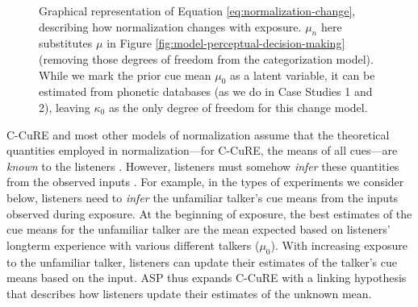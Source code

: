 \documentclass[
  11pt,
  man,floatsintext]{apa6}
\begin{document}
\begin{figure}
\centering
\caption{Graphical representation of Equation \ref{eq:normalization-change}, describing how normalization changes with exposure. $\mu_n$ here substitutes $\mu$ in Figure \ref{fig:model-perceptual-decision-making} (removing those degrees of freedom from the categorization model). While we mark the prior cue mean $\mu_0$ as a latent variable, it can be estimated from phonetic databases (as we do in  Case Studies 1 and 2), leaving $\kappa_0$ as the only degree of freedom for this change model.\label{fig:graphical-model-changes-normalization}}
\end{figure}

C-CuRE and most other models of normalization assume that the theoretical quantities employed in normalization---for C-CuRE, the means of all cues---are \emph{known} to the listeners \autocites[e.g.,][]{apfelbaum-mcmurray2015,mcmurray-jongman2011}. However, listeners must somehow \emph{infer} these quantities from the observed inputs \autocites[see also][]{barreda2012,magnuson-nusbaum2007,weatherholtz-jaeger2016}. For example, in the types of experiments we consider below, listeners need to \emph{infer} the unfamiliar talker's cue means from the inputs observed during exposure. At the beginning of exposure, the best estimates of the cue means for the unfamiliar talker are the mean expected based on listeners' longterm experience with various different talkers (\(\mu_0\)). With increasing exposure to the unfamiliar talker, listeners can update their estimates of the talker's cue means based on the input. ASP thus expands C-CuRE with a linking hypothesis that describes how listeners update their estimates of the unknown mean.
\end{document}
